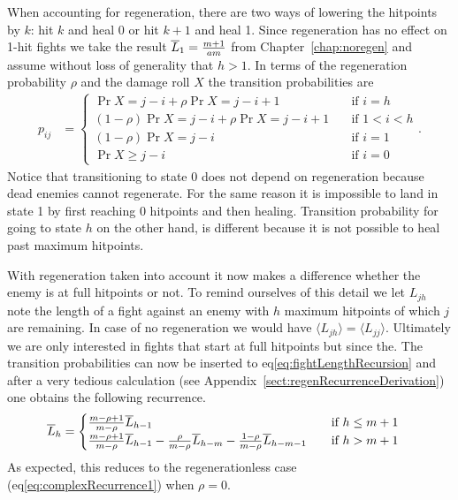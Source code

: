 When accounting for regeneration, there are two ways of lowering the hitpoints by $k$: hit $k$ and heal 0 or hit $k+1$ and heal 1. Since regeneration has no effect on 1-hit fights we take the result $\overline{L}_1 = \frac{m+1}{am}$ from Chapter~\ref{chap:noregen} and assume without loss of generality that $h>1$. In terms of the regeneration probability $\rho$ and the damage roll $X$ the transition probabilities are
\begin{align}
    p_{ij}
         &= \begin{cases}
			 \Pr{X = j-i} + \rho \Pr{X = j-i+1} \quad &\mbox{if } i = h \\
            (1-\rho)\Pr{X = j-i} + \rho \Pr{X = j-i+1} \quad &\mbox{if } 1 < i < h \\
            (1-\rho)\Pr{X = j-i} \quad &\mbox{if } i = 1 \\
            \Pr{X \geq j-i} \quad &\mbox{if } i = 0
        \end{cases}\label{eq:damageDistributionRegen}.
\end{align}
Notice that transitioning to state 0 does not depend on regeneration because dead enemies cannot regenerate. For the same reason it is impossible to land in state 1 by first reaching 0 hitpoints and then healing. Transition probability for going to state $h$ on the other hand, is different because it is not possible to heal past maximum hitpoints.

With regeneration taken into account it now makes a difference whether the enemy is at full hitpoints or not. To remind ourselves of this detail we let $L_{jh}$ note the length of a fight against an enemy with $h$ maximum hitpoints of which $j$ are remaining. In case of no regeneration we would have $\langle L_{jh} \rangle = \langle L_{jj} \rangle$. Ultimately we are only interested in fights that start at full hitpoints but since the. The transition probabilities can now be inserted to eq\ref{eq:fightLengthRecursion} and after a very tedious calculation (see Appendix~\ref{sect:regenRecurrenceDerivation}) one obtains the following recurrence.
\begin{align}\label{eq:regenLengthRecurrence}
    \overline{L}_h &= \begin{cases}
        \frac{m-\rho+1}{m-\rho}\overline{L}_{h-1} \quad &\mbox{if } h \leq m+1\\
        \frac{m-\rho+1}{m-\rho}\overline{L}_{h-1} - \frac{\rho}{m-\rho}\overline{L}_{h-m} - \frac{1-\rho}{m-\rho}\overline{L}_{h-m-1} \quad &\mbox{if } h > m+1
    \end{cases}
\end{align}
As expected, this reduces to the regenerationless case (eq\ref{eq:complexRecurrence1}) when $\rho=0$.

